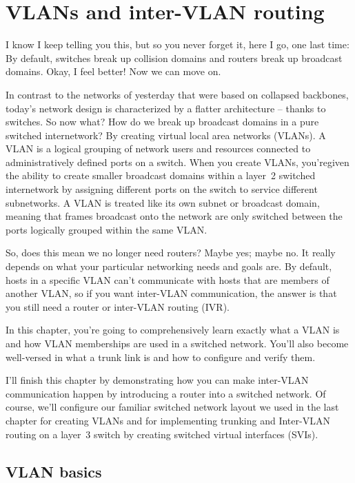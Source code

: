\chapter{VLANs and inter-VLAN routing}
\label{chap:lammle-ch11}

I know I keep telling you this, but so you never forget it, here I go, one last time: By default, switches break up collision domains and routers break up broadcast domains.
Okay, I feel better! Now we can move on.

In contrast to the networks of yesterday that were based on collapsed
backbones, today's network design is characterized by a flatter
architecture -- thanks to switches. So now what? How do we break up
broadcast domains in a pure switched internetwork? By creating virtual
local area networks (VLANs). A VLAN is a logical grouping of network
users and resources connected to administratively defined ports on a
switch. When you create VLANs, you'regiven the ability to create smaller
broadcast domains within a layer~2 switched internetwork by assigning
different ports on the switch to service different subnetworks. A VLAN
is treated like its own subnet or broadcast domain, meaning that frames
broadcast onto the network are only switched between the ports logically
grouped within the same VLAN.

So, does this mean we no longer need routers? Maybe yes; maybe no. It
really depends on what your particular networking needs and goals are.
By default, hosts in a specific VLAN can't communicate with hosts that
are members of another VLAN, so if you want inter-VLAN communication,
the answer is that you still need a router or inter-VLAN routing (IVR).

In this chapter, you're going to comprehensively learn exactly what a VLAN is and how VLAN memberships are used in a switched network.
You'll also become well-versed in what a trunk link is and how to configure and verify them.

I'll finish this chapter by demonstrating how you can make inter-VLAN communication happen by introducing a router into a switched network.
Of course, we'll configure our familiar switched network layout we used in the last chapter for creating VLANs and for implementing trunking and Inter-VLAN routing on a layer~3 switch by creating switched virtual interfaces (SVIs).


\section{VLAN basics}

